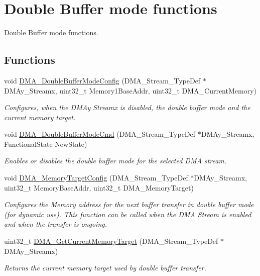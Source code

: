 \hypertarget{group___d_m_a___group3}{\section{Double Buffer mode functions}
\label{group___d_m_a___group3}
}


Double Buffer mode functions.  


\subsection*{Functions}
\begin{DoxyCompactItemize}
\item 
void \hyperlink{group___d_m_a___group3_ga8d0957e50302efaf48a16c62d14c9ca8}{D\-M\-A\-\_\-\-Double\-Buffer\-Mode\-Config} (D\-M\-A\-\_\-\-Stream\-\_\-\-Type\-Def $\ast$D\-M\-Ay\-\_\-\-Streamx, uint32\-\_\-t Memory1\-Base\-Addr, uint32\-\_\-t D\-M\-A\-\_\-\-Current\-Memory)
\begin{DoxyCompactList}\small\item\em Configures, when the D\-M\-Ay Streamx is disabled, the double buffer mode and the current memory target. \end{DoxyCompactList}\item 
void \hyperlink{group___d_m_a___group3_ga7fe09e62ea3125db384829dab59ebe3e}{D\-M\-A\-\_\-\-Double\-Buffer\-Mode\-Cmd} (D\-M\-A\-\_\-\-Stream\-\_\-\-Type\-Def $\ast$D\-M\-Ay\-\_\-\-Streamx, Functional\-State New\-State)
\begin{DoxyCompactList}\small\item\em Enables or disables the double buffer mode for the selected D\-M\-A stream. \end{DoxyCompactList}\item 
void \hyperlink{group___d_m_a___group3_ga4ebcffd32eb6968ac61cfb64a6bae258}{D\-M\-A\-\_\-\-Memory\-Target\-Config} (D\-M\-A\-\_\-\-Stream\-\_\-\-Type\-Def $\ast$D\-M\-Ay\-\_\-\-Streamx, uint32\-\_\-t Memory\-Base\-Addr, uint32\-\_\-t D\-M\-A\-\_\-\-Memory\-Target)
\begin{DoxyCompactList}\small\item\em Configures the Memory address for the next buffer transfer in double buffer mode (for dynamic use). This function can be called when the D\-M\-A Stream is enabled and when the transfer is ongoing. \end{DoxyCompactList}\item 
uint32\-\_\-t \hyperlink{group___d_m_a___group3_ga74b6624f9faa2f43c9369ddbdeab241c}{D\-M\-A\-\_\-\-Get\-Current\-Memory\-Target} (D\-M\-A\-\_\-\-Stream\-\_\-\-Type\-Def $\ast$D\-M\-Ay\-\_\-\-Streamx)
\begin{DoxyCompactList}\small\item\em Returns the current memory target used by double buffer transfer. \end{DoxyCompactList}\end{DoxyCompactItemize}



